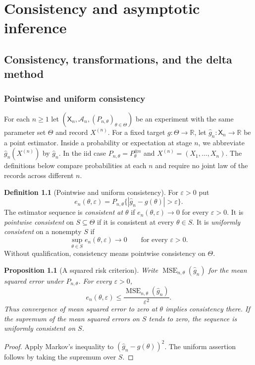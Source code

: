 \documentclass[11pt,oneside]{book}
\newtheorem{proposition}[theorem]{Proposition}
\theoremstyle{definition}
\newtheorem{definition}[theorem]{Definition}
\theoremstyle{remark}
\newcommand{\R}{\mathbb R}
\begin{document}
\chapter{Consistency and asymptotic inference}
\label{chap:asymptotic-inference}

\section{Consistency, transformations, and the delta method}
\label{sec:asymptotic-consistency-transformations}

\subsection{Pointwise and uniform consistency}
\label{subsec:asymptotic-pointwise-uniform-consistency}

For each $n\geq1$ let $(\mathsf X_n,\mathcal A_n,(P_{n,\theta})_{\theta\in\Theta})$
be an experiment with the same parameter set $\Theta$ and record $X^{(n)}$.
For a fixed target $g:\Theta\to\R$, let $\widehat g_n:\mathsf X_n\to\R$
be a point estimator. Inside a probability or expectation at stage $n$,
we abbreviate $\widehat g_n(X^{(n)})$ by $\widehat g_n$.
In the iid case $P_{n,\theta}=P_\theta^{\otimes n}$ and
$X^{(n)}=(X_1,\dots,X_n)$. The definitions below compare
probabilities at each $n$ and require no joint law of the records
across different $n$.

\begin{definition}[Pointwise and uniform consistency]
\label{def:asymptotic-consistency}
For $\varepsilon>0$ put
\[
e_n(\theta,\varepsilon)=P_{n,\theta}\{|\widehat g_n-g(\theta)|>\varepsilon\}.
\]
The estimator sequence is \emph{consistent at $\theta$} if
$e_n(\theta,\varepsilon)\to0$ for every $\varepsilon>0$.
It is \emph{pointwise consistent} on $S\subseteq\Theta$ if it
is consistent at every $\theta\in S$. It is \emph{uniformly
consistent} on a nonempty $S$ if
\[
\sup_{\theta\in S} e_n(\theta,\varepsilon)\longrightarrow0
\qquad\text{for every }\varepsilon>0.
\]
Without qualification, consistency means pointwise consistency on $\Theta$.
\end{definition}

\begin{proposition}[A squared risk criterion]
\label{prop:asymptotic-consistency-mse}
Write $\operatorname{MSE}_{n,\theta}(\widehat g_n)$ for the
mean squared error under $P_{n,\theta}$. For every $\varepsilon>0$,
\[
e_n(\theta,\varepsilon)
\leq \frac{\operatorname{MSE}_{n,\theta}(\widehat g_n)}{\varepsilon^2}.
\]
Thus convergence of mean squared error to zero at $\theta$
implies consistency there. If the supremum of the mean
squared errors on $S$ tends to zero, the sequence is uniformly
consistent on $S$.
\end{proposition}
\begin{proof}
Apply Markov's inequality to $(\widehat g_n-g(\theta))^2$.
The uniform assertion follows by taking the supremum over $S$.
\end{proof}
\end{document}
